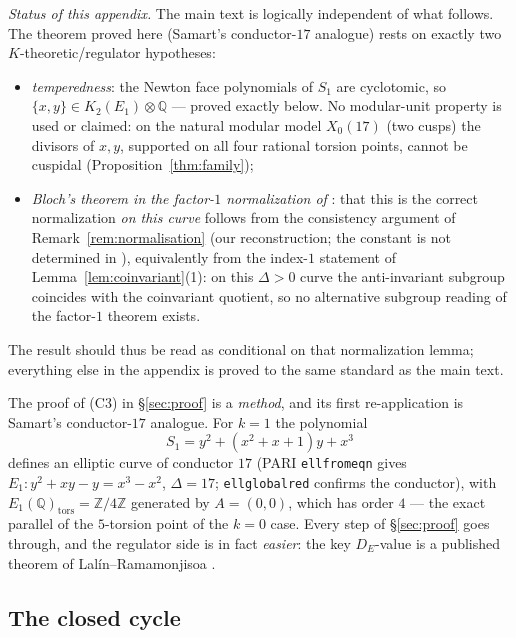 \documentclass[11pt]{amsart}
\theoremstyle{definition}
\theoremstyle{remark}
\newcommand{\Q}{\mathbb{Q}}
\newcommand{\Z}{\mathbb{Z}}
\begin{document}
\emph{Status of this appendix.} The main text is logically independent of
what follows. The theorem proved here (Samart's conductor-$17$ analogue)
rests on exactly two $K$-theoretic/regulator hypotheses:
\begin{itemize}
  \item \emph{temperedness}: the Newton face polynomials of $S_1$ are
  cyclotomic, so $\{x,y\}\in K_2(E_1)\otimes\Q$ --- proved exactly below.
  No modular-unit property is used or claimed: on the natural modular model
  $X_0(17)$ (two cusps) the divisors of $x,y$, supported on all four
  rational torsion points, cannot be cuspidal
  (Proposition~\ref{thm:family});
  \item \emph{Bloch's theorem in the factor-$1$ normalization of}
  \cite[Thm.~6]{LalinRam}: that this is the correct normalization \emph{on
  this curve} follows from the consistency argument of
  Remark~\ref{rem:normalisation} (our reconstruction; the constant is not
  determined in \cite{LalinRam}), equivalently from the index-$1$ statement
  of Lemma~\ref{lem:coinvariant}(1): on this $\Delta>0$ curve the
  anti-invariant subgroup coincides with the coinvariant quotient, so no
  alternative subgroup reading of the factor-$1$ theorem exists.
\end{itemize}
The result should thus be read as conditional on that normalization lemma;
everything else in the appendix is proved to the same standard as the main
text.

The proof of (C3) in \S\ref{sec:proof} is a \emph{method}, and its first
re-application is Samart's conductor-$17$ analogue. For $k=1$ the polynomial
\[
  S_1=y^2+(x^2+x+1)y+x^3
\]
defines an elliptic curve of conductor $17$ (PARI \texttt{ellfromeqn} gives
$E_1: y^2+xy-y=x^3-x^2$, $\Delta=17$; \texttt{ellglobalred} confirms the
conductor), with $E_1(\Q)_{\mathrm{tors}}=\Z/4\Z$ generated by $A=(0,0)$,
which has order $4$ --- the exact parallel of the $5$-torsion point of the
$k=0$ case. Every step of \S\ref{sec:proof} goes through, and the regulator
side is in fact \emph{easier}: the key $D_E$-value is a published theorem of
Lal\'in--Ramamonjisoa \cite{LalinRam}.

\subsection{The closed cycle}
\end{document}
